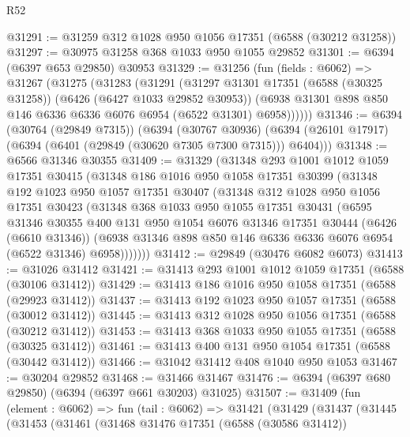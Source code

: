 \begin{lexlean}{R52}
\begin{coremodule}
@31291 := @31259 @312 @1028 @950 @1056 @17351 (@6588 (@30212 @31258))
@31297 := @30975 @31258 @368 @1033 @950 @1055 @29852
@31301 := @6394 (@6397 @653 @29850) @30953
@31329 := @31256
    (fun (fields : @6062) =>
    @31267
      (@31275
        (@31283
          (@31291
            (@31297
              @31301
              @17351
              (@6588 (@30325 @31258))
              (@6426 (@6427 @1033 @29852 @30953))
              (@6938 @31301 @898 @850 @146 @6336 @6336 @6076 @6954 (@6522 @31301) @6958))))))
@31346 := @6394
    (@30764 (@29849 @7315))
    (@6394
      (@30767 @30936)
      (@6394 (@26101 @17917) (@6394 (@6401 (@29849 (@30620 @7305 @7300 @7315))) @6404)))
@31348 := @6566 @31346 @30355
@31409 := @31329
    (@31348
      @293
      @1001
      @1012
      @1059
      @17351
      @30415
      (@31348
        @186
        @1016
        @950
        @1058
        @17351
        @30399
        (@31348
          @192
          @1023
          @950
          @1057
          @17351
          @30407
          (@31348
            @312
            @1028
            @950
            @1056
            @17351
            @30423
            (@31348
              @368
              @1033
              @950
              @1055
              @17351
              @30431
              (@6595
                @31346
                @30355
                @400
                @131
                @950
                @1054
                @6076
                @31346
                @17351
                @30444
                (@6426 (@6610 @31346))
                (@6938 @31346 @898 @850 @146 @6336 @6336 @6076 @6954 (@6522 @31346) @6958)))))))
@31412 := @29849 (@30476 @6082 @6073)
@31413 := @31026 @31412
@31421 := @31413 @293 @1001 @1012 @1059 @17351 (@6588 (@30106 @31412))
@31429 := @31413 @186 @1016 @950 @1058 @17351 (@6588 (@29923 @31412))
@31437 := @31413 @192 @1023 @950 @1057 @17351 (@6588 (@30012 @31412))
@31445 := @31413 @312 @1028 @950 @1056 @17351 (@6588 (@30212 @31412))
@31453 := @31413 @368 @1033 @950 @1055 @17351 (@6588 (@30325 @31412))
@31461 := @31413 @400 @131 @950 @1054 @17351 (@6588 (@30442 @31412))
@31466 := @31042 @31412 @408 @1040 @950 @1053
@31467 := @30204 @29852
@31468 := @31466 @31467
@31476 := @6394 (@6397 @680 @29850) (@6394 (@6397 @661 @30203) @31025)
@31507 := @31409
    (fun (element : @6062) =>
    fun (tail : @6062) =>
    @31421
      (@31429
        (@31437
          (@31445
            (@31453
              (@31461
                (@31468
                  @31476
                  @17351
                  (@6588 (@30586 @31412))

\end{coremodule}
\end{lexlean}

